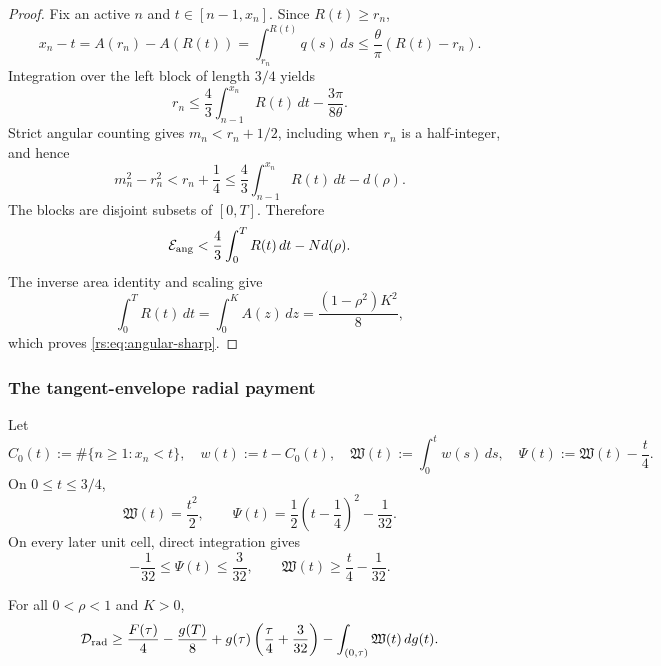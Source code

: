 \begin{proof}
Fix an active $n$ and $t\in[n-1,x_n]$.  Since $R(t)\geq r_n$,
\[
 x_n-t=A(r_n)-A(R(t))
 =\int_{r_n}^{R(t)}q(s)\,ds
 \leq\frac{\theta}{\pi}(R(t)-r_n).
\]
Integration over the left block of length $3/4$ yields
\begin{equation}
 r_n\leq\frac43\int_{n-1}^{x_n}R(t)\,dt
       -\frac{3\pi}{8\theta}.
 \label{rs:eq:rn-block}
\end{equation}
Strict angular counting gives $m_n<r_n+1/2$, including when $r_n$ is a
half-integer, and hence
\begin{equation}
 m_n^2-r_n^2<r_n+\frac14
 \leq\frac43\int_{n-1}^{x_n}R(t)\,dt-d(\rho).
 \label{rs:eq:one-angular-block}
\end{equation}
The blocks are disjoint subsets of $[0,T]$.  Therefore
\[
 \mathcal E_{\rm ang}
 <\frac43\int_0^TR(t)\,dt-Nd(\rho).
\]
The inverse area identity and scaling give
\[
 \int_0^TR(t)\,dt=\int_0^KA(z)\,dz
 =\frac{(1-\rho^2)K^2}{8},
\]
which proves \eqref{rs:eq:angular-sharp}.
\end{proof}

\subsubsection*{The tangent-envelope radial payment}

Let
\begin{equation}
 C_0(t):=\#\{n\geq1:x_n<t\},
 \quad w(t):=t-C_0(t),
 \quad \mathfrak W(t):=\int_0^tw(s)\,ds,
 \quad \Psi(t):=\mathfrak W(t)-\frac t4.
 \label{rs:eq:sawtooth}
\end{equation}
On $0\leq t\leq3/4$,
\begin{equation}
 \mathfrak W(t)=\frac{t^2}{2},
 \qquad
 \Psi(t)=\frac12\left(t-\frac14\right)^2-\frac1{32}.
 \label{rs:eq:first-cell}
\end{equation}
On every later unit cell, direct integration gives
\begin{equation}
 -\frac1{32}\leq\Psi(t)\leq\frac3{32},
 \qquad
 \mathfrak W(t)\geq\frac t4-\frac1{32}.
 \label{rs:eq:sawtooth-bounds}
\end{equation}

\begin{lemma}
\label{rs:lem:retained}
For all $0<\rho<1$ and $K>0$,
\begin{equation}
 \mathcal D_{\rm rad}
 \geq\frac{F(\tau)}4-\frac{g(T)}8
 +g(\tau)\left(\frac\tau4+\frac3{32}\right)
 -\int_{(0,\tau)}\mathfrak W(t)\,dg(t).
 \label{rs:eq:retained-radial}
\end{equation}
\end{lemma}

